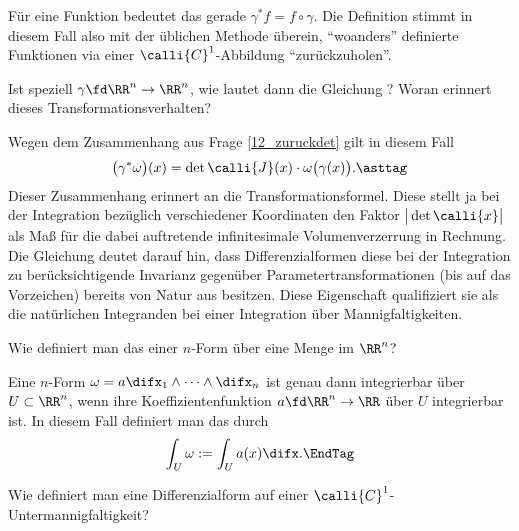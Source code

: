 \begin{antwort}
  Für eine Funktion bedeutet das gerade $\gamma^* f=f\circ \gamma$. 
  Die Definition stimmt in diesem Fall also mit der 
  üblichen Methode überein, "`woanders"' definierte 
  Funktionen via einer $\calli{C}^1$-Abbildung 
  "`zurückzuholen"'. \AntEnd
\end{antwort} 

\begin{frage}
  Ist speziell $\gamma\fd \RR^n\to\RR^n$, wie lautet dann die Gleichung 
  {\astref}? Woran erinnert dieses Transformationsverhalten? 
\end{frage}

\begin{antwort}
  Wegen dem Zusammenhang aus Frage \ref{12_zuruckdet} gilt 
  in diesem Fall
  \[
  \big( \gamma^*\omega \big) (x)=
  \det \calli{J}(x)\cdot \omega\big( \gamma(x) \big).{\asttag}
  \]
  Dieser Zusammenhang erinnert an die Transformationsformel. 
  Diese stellt ja bei der Integration bezüglich verschiedener 
  Koordinaten den Faktor $\big|\det \calli{x}\big|$ als Maß 
  für die dabei auftretende infinitesimale Volumenverzerrung 
  in Rechnung. Die Gleichung {\astref} deutet darauf hin, dass 
  Differenzialformen diese bei der Integration zu berücksichtigende 
  Invarianz gegenüber Parametertransformationen (bis auf das Vorzeichen) 
  bereits von Natur aus besitzen. Diese Eigenschaft 
  qualifiziert sie als die natürlichen Integranden 
  bei einer Integration über Mannigfaltigkeiten. 
  \AntEnd 
\end{antwort} 

\begin{frage}\label{12_integral1}
  Wie definiert man das  
  einer $n$-Form über eine Menge im $\RR^n$?
\end{frage}

\begin{antwort}
  Eine $n$-Form 
  $\omega=a \difx_1\wedge\cdots\wedge \difx_n$ 
  ist genau dann integrierbar über $U\subset\RR^n$, wenn ihre 
  Koeffizientenfunktion $a\fd \RR^n\to\RR$ über $U$ 
  integrierbar ist. In diesem Fall definiert man das 
   durch
  \[
  \int_U \omega := \int_U a(x) \difx.\EndTag
  \]
\end{antwort} 

\begin{frage}
  Wie definiert man eine Differenzialform 
  auf einer $\calli{C}^1$-Untermannigfaltigkeit?
\end{frage}


